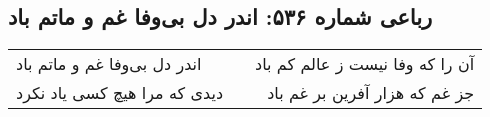 \begin{center}
\section*{رباعی شماره ۵۳۶: اندر دل بی‌وفا غم و ماتم باد}
\label{sec:0536}
\begin{longtable}{l p{0.5cm} r}
اندر دل بی‌وفا غم و ماتم باد
&&
آن را که وفا نیست ز عالم کم باد
\\
دیدی که مرا هیچ کسی یاد نکرد
&&
جز غم که هزار آفرین بر غم باد
\\
\end{longtable}
\end{center}
